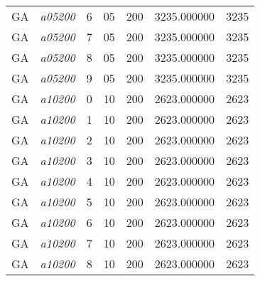 {\begin{longtable}{cc|c|cc|cc}
			GA                 & \textit{a05200}    & 6                               & 05               & 200              & 3235.000000                          & 3235 \\  
			GA                 & \textit{a05200}    & 7                               & 05               & 200              & 3235.000000                          & 3235 \\  
			GA                 & \textit{a05200}    & 8                               & 05               & 200              & 3235.000000                          & 3235 \\  
			GA                 & \textit{a05200}    & 9                               & 05               & 200              & 3235.000000                          & 3235 \\  \hline
			GA                 & \textit{a10200}    & 0                               & 10               & 200              & 2623.000000                          & 2623 \\  
			GA                 & \textit{a10200}    & 1                               & 10               & 200              & 2623.000000                          & 2623 \\  
			GA                 & \textit{a10200}    & 2                               & 10               & 200              & 2623.000000                          & 2623 \\  
			GA                 & \textit{a10200}    & 3                               & 10               & 200              & 2623.000000                          & 2623 \\  
			GA                 & \textit{a10200}    & 4                               & 10               & 200              & 2623.000000                          & 2623 \\  
			GA                 & \textit{a10200}    & 5                               & 10               & 200              & 2623.000000                          & 2623 \\  
			GA                 & \textit{a10200}    & 6                               & 10               & 200              & 2623.000000                          & 2623 \\  
			GA                 & \textit{a10200}    & 7                               & 10               & 200              & 2623.000000                          & 2623 \\  
			GA                 & \textit{a10200}    & 8                               & 10               & 200              & 2623.000000                          & 2623 \\  

\end{longtable}}
